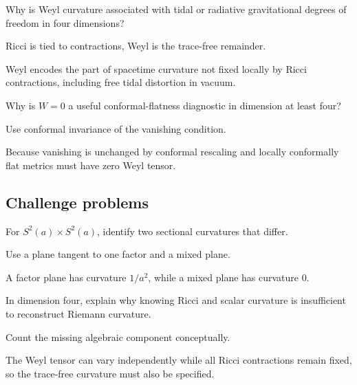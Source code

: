 \begin{exercise}[Relativity]\label{exr:vii28-ped-13}
Why is Weyl curvature associated with tidal or radiative gravitational degrees of freedom in four dimensions?
\end{exercise}

\begin{hint}
Ricci is tied to contractions, Weyl is the trace-free remainder.
\end{hint}

\begin{solution}
Weyl encodes the part of spacetime curvature not fixed locally by Ricci contractions, including free tidal distortion in vacuum.
\end{solution}

\begin{exercise}\label{exr:vii28-ped-14}
Why is \(W=0\) a useful conformal-flatness diagnostic in dimension at least four?
\end{exercise}

\begin{hint}
Use conformal invariance of the vanishing condition.
\end{hint}

\begin{solution}
Because vanishing is unchanged by conformal rescaling and locally conformally flat metrics must have zero Weyl tensor.
\end{solution}

\subsection*{Challenge problems}

\begin{exercise}\label{exr:vii28-ped-15}
For \(S^2(a)\times S^2(a)\), identify two sectional curvatures that differ.
\end{exercise}

\begin{hint}
Use a plane tangent to one factor and a mixed plane.
\end{hint}

\begin{solution}
A factor plane has curvature \(1/a^2\), while a mixed plane has curvature \(0\).
\end{solution}

\begin{exercise}\label{exr:vii28-ped-16}
In dimension four, explain why knowing Ricci and scalar curvature is insufficient to reconstruct Riemann curvature.
\end{exercise}

\begin{hint}
Count the missing algebraic component conceptually.
\end{hint}

\begin{solution}
The Weyl tensor can vary independently while all Ricci contractions remain fixed, so the trace-free curvature must also be specified.
\end{solution}

